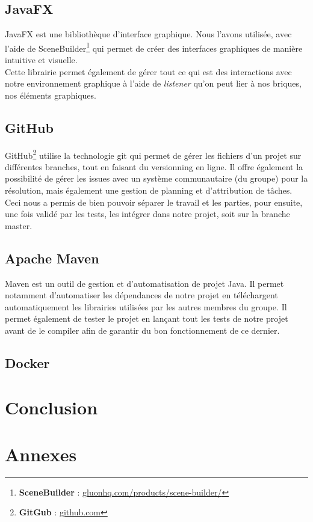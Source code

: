 \documentclass[a4paper,12pt]{article}
\begin{document}
		\subsection{JavaFX}
		JavaFX est une bibliothèque d'interface graphique. Nous l'avons utilisée, avec l'aide de SceneBuilder\footnote{\textbf{SceneBuilder} : \href{http://gluonhq.com/products/scene-builder/}{gluonhq.com/products/scene-builder/}} qui permet de créer des interfaces graphiques de manière intuitive et visuelle. \\
		Cette librairie permet également de gérer tout ce qui est des interactions avec notre environnement graphique à l'aide de \textit{listener} qu'on peut lier à nos briques, nos éléments graphiques. 
		
		\subsection{GitHub}
		GitHub\footnote{\textbf{GitGub} : \href{http:/github.com}{github.com}} utilise la technologie git qui permet de gérer les fichiers d'un projet sur différentes branches, tout en faisant du versionning en ligne. Il offre également la possibilité de gérer les issues avec un système communautaire (du groupe) pour la résolution, mais également une gestion de planning et d'attribution de tâches. \\
		Ceci nous a permis de bien pouvoir séparer le travail et les parties, pour ensuite, une fois validé par les tests, les intégrer dans notre projet, soit sur la branche master. 
		
		\subsection{Apache Maven} \label{maven}
		Maven est un outil de gestion et d'automatisation de projet Java. Il permet notamment d'automatiser les dépendances de notre projet en téléchargent automatiquement les librairies utilisées par les autres membres du groupe. Il permet également de tester le projet en lançant tout les tests de notre projet avant de le compiler afin de garantir du bon fonctionnement de ce dernier. 
		
		\subsection{Docker}
	
	\section{Conclusion}
	
	\newpage
	\section{Annexes}

	
	
	
	
\end{document}
